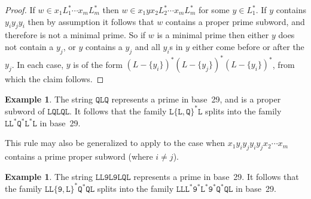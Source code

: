 \documentclass[12pt]{article}
\theoremstyle{plain}
\theoremstyle{definition}
\newtheorem{example}[theorem]{Example}
\newcommand{\0}{\mathtt{0}}
\newcommand{\1}{\mathtt{1}}
\newcommand{\2}{\mathtt{2}}
\newcommand{\3}{\mathtt{3}}
\newcommand{\4}{\mathtt{4}}
\newcommand{\5}{\mathtt{5}}
\newcommand{\6}{\mathtt{6}}
\newcommand{\7}{\mathtt{7}}
\newcommand{\8}{\mathtt{8}}
\newcommand{\9}{\mathtt{9}}
\begin{document}
\begin{proof}
If $w\in x_1L_1^*\dotsm x_mL_m^*$ then $w\in x_1yx_2L_2^*\dotsm x_mL_m^*$ for some $y\in L_1^*$.
If $y$ contains $y_iy_jy_i$ then by assumption it follows that $w$ contains a proper prime subword,
and therefore is not a minimal prime.  So if $w$ is a minimal prime then either $y$ does not contain
a $y_j$, or $y$ contains a $y_j$ and all $y_i$s in $y$ either come before or after the $y_j$.
In each case, $y$ is of the form $(L-\{y_i\})^*(L-\{y_j\})^*(L-\{y_i\})^*$, from which the claim follows.
\end{proof}
\begin{example}
The string $\mathtt{QLQ}$ represents a prime in base~29, and is a proper subword of $\mathtt{LQLQL}$.
It follows that the family $\mathtt{L}\{\mathtt{L},\mathtt{Q}\}^*\mathtt{L}$ splits into the family $\mathtt{L}\mathtt{L}^*\mathtt{Q}^*\mathtt{L}^*\mathtt{L}$ in base~29.
\end{example}
This rule may also be generalized to apply to the case when $x_1y_iy_jy_iy_jx_2\dotsm x_m$ contains a prime proper subword (where $i\neq j$).
\begin{example}
The string $\mathtt{LL9L9LQL}$ represents a prime in base~29.  It follows that the family $\mathtt{LL\{\mathtt{9},\mathtt{L}\}^*\mathtt{Q}^*\mathtt{QL}}$ splits into the family $\mathtt{LL\mathtt{L}^*\mathtt{9}^*\mathtt{L}^*\mathtt{9}^*\mathtt{Q}^*\mathtt{QL}}$ in base~29.
\end{example}
\end{document}
